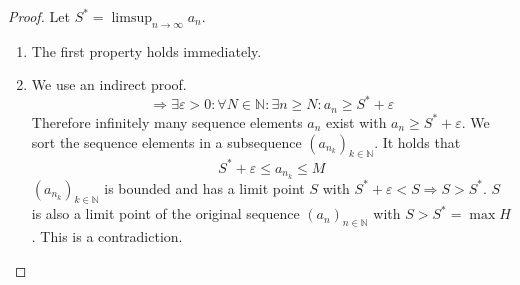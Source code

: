 \documentclass[a4paper,landscape,twocolumn]{article}
\newcommand\seq[1]{{\left(#1\right)}_{n \in \mathbb N}}
\begin{document}
\begin{proof}
  Let $S^* = \limsup_{n\to\infty} a_n$.
  \begin{enumerate}
    \item The first property holds immediately.
    \item
      We use an indirect proof.
      \[ \Rightarrow \exists \varepsilon > 0: \forall N \in \mathbb N: \exists n \geq N: a_n \geq S^* + \varepsilon \]
      Therefore infinitely many sequence elements $a_n$ exist with $a_n \geq S^* + \varepsilon$.
      We sort the sequence elements in a subsequence $\left(a_{n_k}\right)_{k \in \mathbb N}$.
      It holds that
      \[ S^* + \varepsilon \leq a_{n_k} \leq M \]
      $\left(a_{n_k}\right)_{k \in \mathbb N}$ is bounded and has a limit point $S$
      with $S^* + \varepsilon < S \Rightarrow S > S^*$.
      $S$ is also a limit point of the original sequence $\seq{a_n}$ with $S > S^* = \max{H}$.
      This is a contradiction.
  \end{enumerate}
\end{proof}
\end{document}
